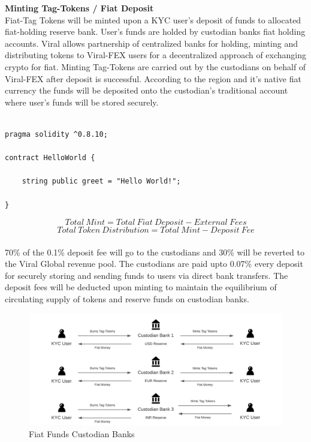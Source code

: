 \documentclass[10pt]{article}
\begin{document}
\textbf{Minting Tag-Tokens / Fiat Deposit}\\

Fiat-Tag Tokens will be minted upon a KYC user's deposit of funds to allocated fiat-holding reserve bank. User's funds are holded by custodian banks fiat holding accounts. Viral allows partnership of centralized banks for holding, minting and distributing tokens to Viral-FEX users for a decentralized approach of exchanging crypto for fiat. Minting Tag-Tokens are carried out by the  custodians on behalf of Viral-FEX after deposit is successful. According to the region and it's native fiat currency the funds will be deposited onto the custodian's traditional account where user's funds will be stored securely.\\

\begin{lstlisting}[language=Solidity, caption={Custodian Mint}, numbers=none]

pragma solidity ^0.8.10;

contract HelloWorld {

    string public greet = "Hello World!";
    
}
\end{lstlisting}

\begin{equation}
Total\:Mint=Total\:Fiat\:Deposit-External\:Fees
\end{equation}
\begin{equation}
Total\:Token\:Distribution=Total\:Mint-Deposit\:Fee
\end{equation}\\

70\% of the 0.1\% deposit fee will go to the custodians and 30\% will be reverted to the Viral Global revenue pool. The custodians are paid upto 0.07\% every deposit for securely storing and sending funds to users via direct bank transfers. The deposit fees will be deducted upon minting to maintain the equilibrium of circulating supply of tokens and reserve funds on custodian banks.\\

\begin{figure}[H]
\begin{center}
\includegraphics[width=\textwidth]{custodian}
\caption{Fiat Funds Custodian Banks}
\end{center}
\end{figure}
\end{document}
